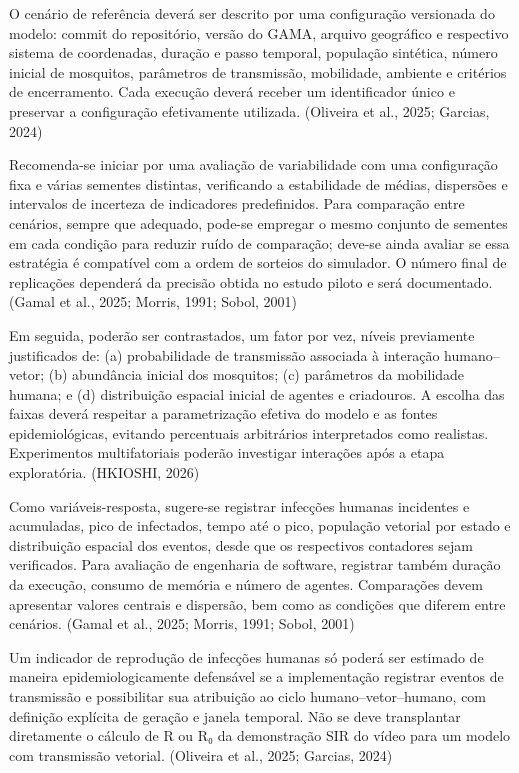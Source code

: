 O cenário de referência deverá ser descrito por uma configuração
versionada do modelo: commit do repositório, versão do GAMA, arquivo
geográfico e respectivo sistema de coordenadas, duração e passo
temporal, população sintética, número inicial de mosquitos, parâmetros
de transmissão, mobilidade, ambiente e critérios de encerramento. Cada
execução deverá receber um identificador único e preservar a
configuração efetivamente utilizada. (Oliveira et al., 2025; Garcias,
2024)

Recomenda-se iniciar por uma avaliação de variabilidade com uma
configuração fixa e várias sementes distintas, verificando a
estabilidade de médias, dispersões e intervalos de incerteza de
indicadores predefinidos. Para comparação entre cenários, sempre que
adequado, pode-se empregar o mesmo conjunto de sementes em cada condição
para reduzir ruído de comparação; deve-se ainda avaliar se essa
estratégia é compatível com a ordem de sorteios do simulador. O número
final de replicações dependerá da precisão obtida no estudo piloto e
será documentado. (Gamal et al., 2025; Morris, 1991; Sobol, 2001)

Em seguida, poderão ser contrastados, um fator por vez, níveis
previamente justificados de: (a) probabilidade de transmissão associada
à interação humano--vetor; (b) abundância inicial dos mosquitos; (c)
parâmetros da mobilidade humana; e (d) distribuição espacial inicial de
agentes e criadouros. A escolha das faixas deverá respeitar a
parametrização efetiva do modelo e as fontes epidemiológicas, evitando
percentuais arbitrários interpretados como realistas. Experimentos
multifatoriais poderão investigar interações após a etapa exploratória.
(HKIOSHI, 2026)

Como variáveis-resposta, sugere-se registrar infecções humanas
incidentes e acumuladas, pico de infectados, tempo até o pico, população
vetorial por estado e distribuição espacial dos eventos, desde que os
respectivos contadores sejam verificados. Para avaliação de engenharia
de software, registrar também duração da execução, consumo de memória e
número de agentes. Comparações devem apresentar valores centrais e
dispersão, bem como as condições que diferem entre cenários. (Gamal et
al., 2025; Morris, 1991; Sobol, 2001)

Um indicador de reprodução de infecções humanas só poderá ser estimado
de maneira epidemiologicamente defensável se a implementação registrar
eventos de transmissão e possibilitar sua atribuição ao ciclo
humano--vetor--humano, com definição explícita de geração e janela
temporal. Não se deve transplantar diretamente o cálculo de R ou R₀ da
demonstração SIR do vídeo para um modelo com transmissão vetorial.
(Oliveira et al., 2025; Garcias, 2024)

